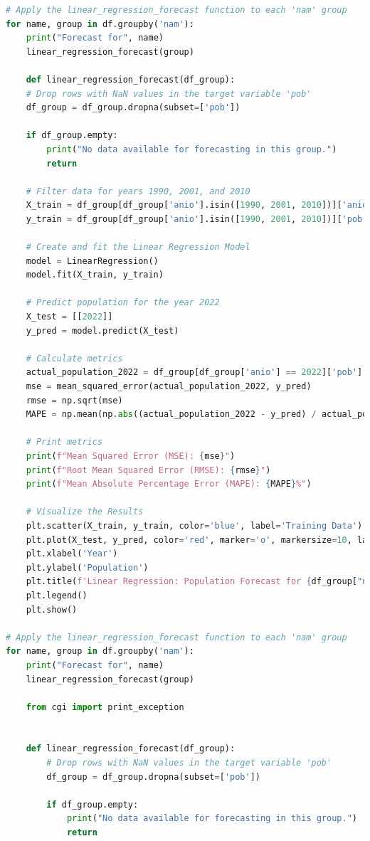 \documentclass{article}
\theoremstyle{mytheoremstyle}
\theoremstyle{mytheoremstyle}
\theoremstyle{myproblemstyle}
\begin{document}
\begin{lstlisting}[language=Python, caption= Regresion Lineal.ipynb,label={lst:LR.ipynb}]
# Apply the linear_regression_forecast function to each 'nam' group
for name, group in df.groupby('nam'):
    print("Forecast for", name)
    linear_regression_forecast(group)

    def linear_regression_forecast(df_group):
    # Drop rows with NaN values in the target variable 'pob'
    df_group = df_group.dropna(subset=['pob'])

    if df_group.empty:
        print("No data available for forecasting in this group.")
        return

    # Filter data for years 1990, 2001, and 2010
    X_train = df_group[df_group['anio'].isin([1990, 2001, 2010])]['anio'].values.reshape(-1, 1)
    y_train = df_group[df_group['anio'].isin([1990, 2001, 2010])]['pob'].values

    # Create and fit the Linear Regression Model
    model = LinearRegression()
    model.fit(X_train, y_train)

    # Predict population for the year 2022
    X_test = [[2022]]
    y_pred = model.predict(X_test)

    # Calculate metrics
    actual_population_2022 = df_group[df_group['anio'] == 2022]['pob'].values
    mse = mean_squared_error(actual_population_2022, y_pred)
    rmse = np.sqrt(mse)
    MAPE = np.mean(np.abs((actual_population_2022 - y_pred) / actual_population_2022)) * 100

    # Print metrics
    print(f"Mean Squared Error (MSE): {mse}")
    print(f"Root Mean Squared Error (RMSE): {rmse}")
    print(f"Mean Absolute Percentage Error (MAPE): {MAPE}%")

    # Visualize the Results
    plt.scatter(X_train, y_train, color='blue', label='Training Data')
    plt.plot(X_test, y_pred, color='red', marker='o', markersize=10, label='Predicted Population for 2022')
    plt.xlabel('Year')
    plt.ylabel('Population')
    plt.title(f'Linear Regression: Population Forecast for {df_group["nam"].iloc[0]}')
    plt.legend()
    plt.show()

# Apply the linear_regression_forecast function to each 'nam' group
for name, group in df.groupby('nam'):
    print("Forecast for", name)
    linear_regression_forecast(group)

    from cgi import print_exception


    def linear_regression_forecast(df_group):
        # Drop rows with NaN values in the target variable 'pob'
        df_group = df_group.dropna(subset=['pob'])
    
        if df_group.empty:
            print("No data available for forecasting in this group.")
            return
    

\end{lstlisting}
\end{document}
